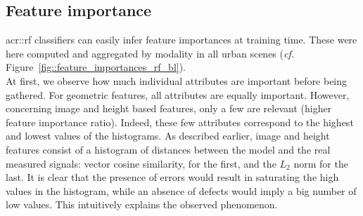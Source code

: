     \subsection{Feature importance}
        \label{subsec::experiments::baseline_feature_analysis::feature_importance}
        \begin{figure}[htpb]
            \centering
        \end{figure}
        
        \gls{acr::rf} classifiers can easily infer feature importances at training time.
        These were here computed and aggregated by modality in all urban scenes (\textit{cf.} Figure~\ref{fig::feature_importances_rf_bl}).\\

        At first, we observe how much individual attributes are important before being gathered.
        For geometric features, all attributes are equally important.
        However, concerning image and height based features, only a few are relevant (higher feature importance ratio).
        Indeed, these few attributes correspond to the highest and lowest values of the histograms.
        As described earlier, image and height features consist of a histogram of distances between the model and the real measured signals:
        vector cosine similarity, for the first, and the \(L_2\) norm for the last.
        It is clear that the presence of errors would result in saturating the high values in the histogram, while an absence of defects would imply a big number of low values.
        This intuitively explains the observed phenomenon.\\
        
